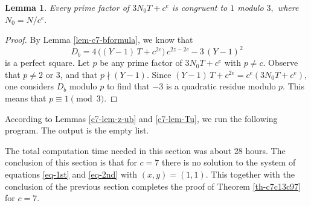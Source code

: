 \documentclass[11pt]{amsart}
\newtheorem{lem}{Lemma}[section]
\numberwithin{equation}{section}
\begin{document}
\begin{lem}\label{lem-c7-finalcodes}
Every prime factor of $3 N_0 T+c^e$ is congruent to $1$ modulo $3,$ where $N_0=N/c^e.$
\end{lem}

\begin{proof}
By Lemma \ref{lem-c7-bformula}, we know that
\[
D_b=4\,\big((Y-1)\,T+c^{2e}\big)\,c^{2z-2e}-3\,(Y-1)^2
\]
is a perfect square.
Let $p$ be any prime factor of $3 N_0 T+c^e$ with $p \ne c$.
Observe that $p \ne 2$ or 3, and that $p \nmid (Y-1)$.
Since $(Y-1)\,T+c^{2e}=c^e(3 N_0 T+c^e)$, one considers $D_b$ modulo $p$ to find that $-3$ is a quadratic residue modulo $p$.
This means that $p \equiv 1 \pmod{3}$. 
\end{proof}

According to Lemmas \ref{c7-lem-z-ub} and \ref{c7-lem-Tu}, we run the following program.
The output is the empty list.


\vspace{0.4cm}
The total computation time needed in this section was about 28 hours.
The conclusion of this section is that for $c=7$ there is no solution to the system of equations \eqref{eq-1st} and \eqref{eq-2nd} with $(x,y)=(1,1)$.
This together with the conclusion of the previous section completes the proof of Theorem \ref{th-c7c13c97} for $c=7$.
\end{document}
